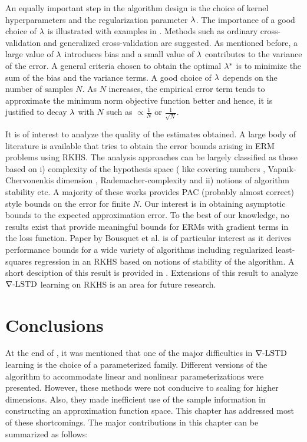An equally important step in the algorithm design is the choice of kernel hyperparameters and the regularization parameter $\lambda$. The importance of a good choice of $\lambda$ is illustrated with examples in \cite{wah90}. Methods such as ordinary cross-validation and generalized cross-validation are suggested. As mentioned before, a large value of $\lambda$ introduces bias and a small value of $\lambda$ contributes to the variance of the error. A general criteria chosen to obtain the optimal $\lambda^*$ is to minimize the sum of the bias and the variance terms. A good choice of $\lambda$ depends on the number of samples $N$. As $N$ increases, the empirical error term tends to approximate the minimum norm objective function better and hence, it is justified to decay $\lambda$ with $N$ such as $\propto \frac{1}{N}$ or $\frac{1}{\sqrt{N}}$. 

It is of interest to analyze the quality of the estimates obtained. A large body of literature is available that tries to obtain the error bounds arising in ERM problems using RKHS. The analysis approaches can be largely classified as those based on i) complexity of the hypothesis space ( like covering numbers \cite{zhou02, zhou03, smazhou03}, Vapnik-Chervonenkis dimension \cite{gir95}, Rademacher-complexity \cite{cormohros10,micponwuzho16} and ii) notions of algorithm stability \cite{boueli01,boueli02} etc. A majority of these works provides PAC (probably almost correct) style bounds on the error for finite $N$.  Our interest is in obtaining asymptotic bounds to the expected approximation error. To the best of our knowledge, no results exist that provide meaningful bounds for ERMs with gradient terms in the loss function. Paper by Bousquet et al. \cite{boueli02} is of particular interest as it derives performance bounds for a wide variety of algorithms including regularized least-squares regression in an RKHS based on notions of stability of the algorithm. A short desciption of this result is provided in . Extensions of this result to analyze $\nabla\text{-LSTD}$ learning on RKHS is an area for future research. 

\section{Conclusions}
\label{s:ch3_conclusions}
At the end of , it was mentioned that one of the major difficulties in $\nabla\text{-LSTD}$ learning is the choice of a parameterized family. Different versions of the algorithm to accommodate linear and nonlinear parameterizations were presented. However, these methods were not conducive to scaling for higher dimensions. Also, they made inefficient use of the sample information in constructing an approximation function space. This chapter has addressed most of these shortcomings. The major contributions in this chapter can be summarized as follows:

